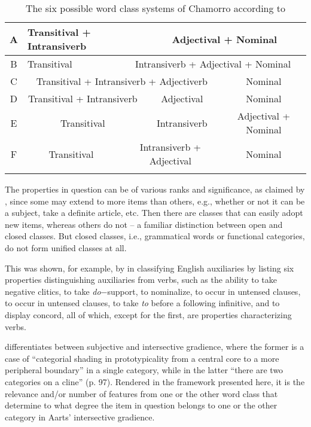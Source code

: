 \documentclass[output=paper]{langsci/langscibook}
\begin{document}
\begin{table}
\centering
{\small
\begin{tabularx}{1\textwidth}{cp{2.24cm}p{2.24cm}p{2.24cm}p{2.24cm}}
\lsptoprule
A & \multicolumn{2}{C|}{Transitival + Intransiverb} & \multicolumn{2}{c}{Adjectival + Nominal}\\
\midrule
B & \multicolumn{1}{C|}{Transitival} & \multicolumn{3}{c}{Intransiverb + Adjectival + Nominal}\\
\midrule
C & \multicolumn{3}{c|}{Transitival + Intransiverb + Adjectiverb} & \multicolumn{1}{c}{Nominal}\\
\midrule
D & \multicolumn{2}{c|}{Transitival + Intransiverb} &
\multicolumn{1}{c|}{Adjectival} & \multicolumn{1}{c}{Nominal}\\
\midrule
E & \multicolumn{2}{c|}{Transitival} & \multicolumn{1}{c|}{Intransiverb} & \multicolumn{1}{c}{Adjectival + Nominal}\\
\midrule
F & \multicolumn{1}{c}{Transitival} & \multicolumn{2}{|c|}{Intransiverb + Adjectival} & \multicolumn{1}{c}{Nominal}\\
\lspbottomrule
\end{tabularx}
}
\caption{The six possible word class systems of Chamorro according to
\textcite{Haspelmath2012}}\label{tab:key:27.2}
\end{table}

The properties in question can be of various ranks and significance, as claimed
by \citet{Crystal1967}, since some may extend to more items than others, e.g.,
whether or not it can be a subject, take a definite article, etc. Then there
are classes that can easily adopt new items, whereas others do not – a familiar
distinction between open and closed classes. But closed classes, i.e.,
grammatical words or functional categories, do not form unified classes at all.

This was shown, for example, by \citet{Radford1976} in classifying English
auxiliaries by listing six properties distinguishing auxiliaries from verbs,
such as the ability to take negative clitics, to take \emph{do}−support, to
nominalize, to occur in untensed clauses, to occur in untensed clauses, to take
\emph{to} before a following infinitive, and to display concord, all of which,
except for the first, are properties characterizing verbs.

\citet{Aarts2007} differentiates between subjective and intersective gradience,
where the former is a case of “categorial shading in prototypicality from a
central core to a more peripheral boundary” in a single category, while in the
latter “there are two categories on a cline” (p. 97). Rendered in the framework
presented here, it is the relevance and/or number of features from one or the
other word class that determine to what degree the item in question belongs
to one or the other category in Aarts’ intersective gradience.
\end{document}
